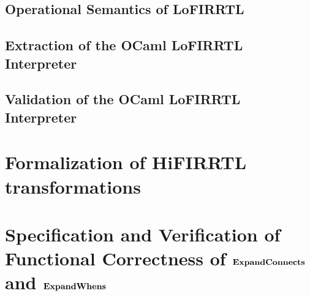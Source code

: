 \documentclass[acmsmall,review,anonymous]{acmart}%
\begin{document}
\subsection{Operational Semantics of LoFIRRTL}\label{sec-lofirrtl-sem}



\subsection{Extraction of the OCaml LoFIRRTL Interpreter}



\subsection{Validation of the OCaml LoFIRRTL Interpreter}\label{sec-validate-interpreter}






\section{Formalization of HiFIRRTL transformations}\label{sec-hi-firrtl-transform}


%




\section{Specification and Verification of Functional Correctness of $\bf ExpandConnects$ and $\bf ExpandWhens$}\label{sec-spec-verif-expand}
\end{document}
